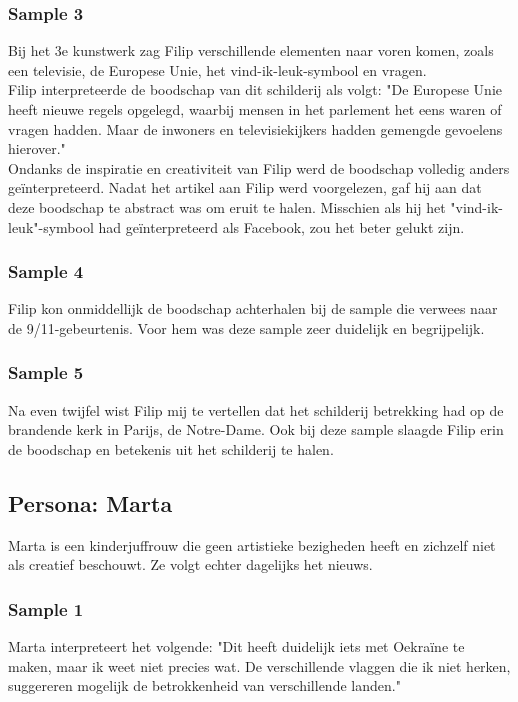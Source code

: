 \subsubsection{Sample 3}
Bij het 3e kunstwerk zag Filip verschillende elementen naar voren komen, zoals een televisie, de Europese Unie, het vind-ik-leuk-symbool en vragen. \\

Filip interpreteerde de boodschap van dit schilderij als volgt: "De Europese Unie heeft nieuwe regels opgelegd, waarbij mensen in het parlement het eens waren of vragen hadden. Maar de inwoners en televisiekijkers hadden gemengde gevoelens hierover." \\

Ondanks de inspiratie en creativiteit van Filip werd de boodschap volledig anders geïnterpreteerd. Nadat het artikel aan Filip werd voorgelezen, gaf hij aan dat deze boodschap te abstract was om eruit te halen. Misschien als hij het "vind-ik-leuk"-symbool had geïnterpreteerd als Facebook, zou het beter gelukt zijn.

\subsubsection{Sample 4}
Filip kon onmiddellijk de boodschap achterhalen bij de sample die verwees naar de 9/11-gebeurtenis. Voor hem was deze sample zeer duidelijk en begrijpelijk.

\subsubsection{Sample 5}
Na even twijfel wist Filip mij te vertellen dat het schilderij betrekking had op de brandende kerk in Parijs, de Notre-Dame. Ook bij deze sample slaagde Filip erin de boodschap en betekenis uit het schilderij te halen.


\subsection{Persona: Marta}
Marta is een kinderjuffrouw die geen artistieke bezigheden heeft en zichzelf niet als creatief beschouwt. Ze volgt echter dagelijks het nieuws.

\subsubsection{Sample 1}
Marta interpreteert het volgende: "Dit heeft duidelijk iets met Oekraïne te maken, maar ik weet niet precies wat. De verschillende vlaggen die ik niet herken, suggereren mogelijk de betrokkenheid van verschillende landen." \\

